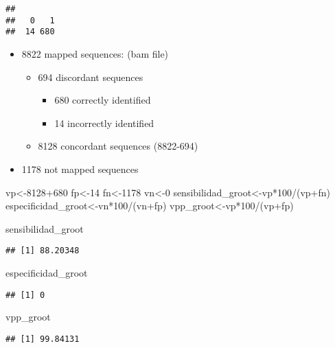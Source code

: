 \documentclass[
]{article}
\newenvironment{Shaded}{\begin{snugshade}}{\end{snugshade}}
\newcommand{\DecValTok}[1]{\textcolor[rgb]{0.00,0.00,0.81}{#1}}
\newcommand{\NormalTok}[1]{#1}
\newcommand{\OtherTok}[1]{\textcolor[rgb]{0.56,0.35,0.01}{#1}}
\newcommand{\SpecialCharTok}[1]{\textcolor[rgb]{0.00,0.00,0.00}{#1}}
\providecommand{\tightlist}{%
  \setlength{\itemsep}{0pt}\setlength{\parskip}{0pt}}
\begin{document}
\begin{verbatim}
## 
##   0   1 
##  14 680
\end{verbatim}

\begin{itemize}
\tightlist
\item
  8822 mapped sequences: (bam file)

  \begin{itemize}
  \tightlist
  \item
    694 discordant sequences

    \begin{itemize}
    \tightlist
    \item
      680 correctly identified\\
    \item
      14 incorrectly identified\\
    \end{itemize}
  \item
    8128 concordant sequences (8822-694)
  \end{itemize}
\item
  1178 not mapped sequences
\end{itemize}

\begin{Shaded}
\begin{Highlighting}[]
\NormalTok{vp}\OtherTok{\textless{}{-}}\DecValTok{8128}\SpecialCharTok{+}\DecValTok{680}
\NormalTok{fp}\OtherTok{\textless{}{-}}\DecValTok{14}
\NormalTok{fn}\OtherTok{\textless{}{-}}\DecValTok{1178}
\NormalTok{vn}\OtherTok{\textless{}{-}}\DecValTok{0}
\NormalTok{sensibilidad\_groot}\OtherTok{\textless{}{-}}\NormalTok{vp}\SpecialCharTok{*}\DecValTok{100}\SpecialCharTok{/}\NormalTok{(vp}\SpecialCharTok{+}\NormalTok{fn)}
\NormalTok{especificidad\_groot}\OtherTok{\textless{}{-}}\NormalTok{vn}\SpecialCharTok{*}\DecValTok{100}\SpecialCharTok{/}\NormalTok{(vn}\SpecialCharTok{+}\NormalTok{fp)}
\NormalTok{vpp\_groot}\OtherTok{\textless{}{-}}\NormalTok{vp}\SpecialCharTok{*}\DecValTok{100}\SpecialCharTok{/}\NormalTok{(vp}\SpecialCharTok{+}\NormalTok{fp)}

\NormalTok{sensibilidad\_groot}
\end{Highlighting}
\end{Shaded}

\begin{verbatim}
## [1] 88.20348
\end{verbatim}

\begin{Shaded}
\begin{Highlighting}[]
\NormalTok{especificidad\_groot}
\end{Highlighting}
\end{Shaded}

\begin{verbatim}
## [1] 0
\end{verbatim}

\begin{Shaded}
\begin{Highlighting}[]
\NormalTok{vpp\_groot}
\end{Highlighting}
\end{Shaded}

\begin{verbatim}
## [1] 99.84131
\end{verbatim}
\end{document}
